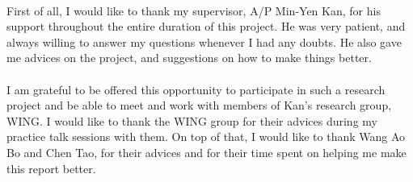 \documentclass[urop]{socreport}
\begin{document}
\begin{acknowledgement}
\paragraph{}
First of all, I would like to thank my supervisor, A/P Min-Yen Kan, for his support throughout the entire duration of this project. He was very patient, and always willing to answer my questions whenever I had any doubts. He also gave me advices on the project, and suggestions on how to make things better.

\paragraph{}
I am grateful to be offered this opportunity to participate in such a research project and be able  to meet and work with members of Kan's research group, WING. I would like to thank the WING group for their advices during my practice talk sessions with them. On top of that, I would like to thank Wang Ao Bo and Chen Tao, for their advices and for their time spent on helping me make this report better.
\end{acknowledgement}

\listoffigures
\listoftables
\tableofcontents




 





\appendix
\end{document}
